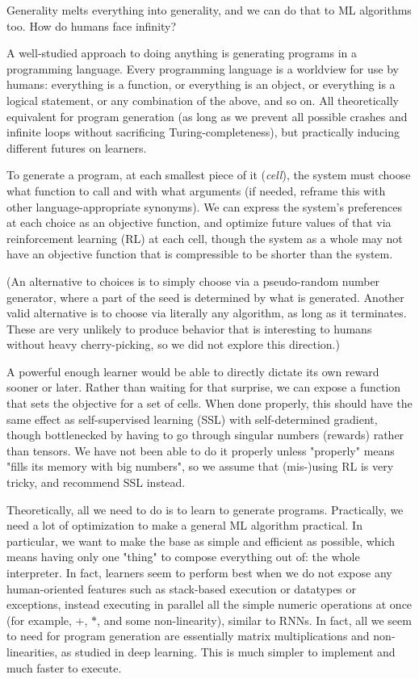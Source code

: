 \documentclass{article}
\begin{document}
Generality melts everything into generality, and we can do that to ML algorithms too. How do humans face infinity?

A well-studied approach to doing anything is generating programs in a programming language. Every programming language is a worldview for use by humans: everything is a function, or everything is an object, or everything is a logical statement, or any combination of the above, and so on. All theoretically equivalent for program generation (as long as we prevent all possible crashes and infinite loops without sacrificing Turing-completeness), but practically inducing different futures on learners.

To generate a program, at each smallest piece of it (\textit{cell}), the system must choose what function to call and with what arguments (if needed, reframe this with other language-appropriate synonyms). We can express the system's preferences at each choice as an objective function, and optimize future values of that via reinforcement learning (RL) at each cell, though the system as a whole may not have an objective function that is compressible to be shorter than the system.

(An alternative to choices is to simply choose via a pseudo-random number generator, where a part of the seed is determined by what is generated. Another valid alternative is to choose via literally any algorithm, as long as it terminates. These are very unlikely to produce behavior that is interesting to humans without heavy cherry-picking, so we did not explore this direction.)

A powerful enough learner would be able to directly dictate its own reward sooner or later. Rather than waiting for that surprise, we can expose a function that sets the objective for a set of cells. When done properly, this should have the same effect as self-supervised learning (SSL) with self-determined gradient, though bottlenecked by having to go through singular numbers (rewards) rather than tensors. We have not been able to do it properly unless "properly" means "fills its memory with big numbers", so we assume that (mis-)using RL is very tricky, and recommend SSL instead.

Theoretically, all we need to do is to learn to generate programs. Practically, we need a lot of optimization to make a general ML algorithm practical. In particular, we want to make the base as simple and efficient as possible, which means having only one "thing" to compose everything out of: the whole interpreter. In fact, learners seem to perform best when we do not expose any human-oriented features such as stack-based execution or datatypes or exceptions, instead executing in parallel all the simple numeric operations at once (for example, $+$, $*$, and some non-linearity), similar to RNNs. In fact, all we seem to need for program generation are essentially matrix multiplications and non-linearities, as studied in deep learning. This is much simpler to implement and much faster to execute.
\end{document}

